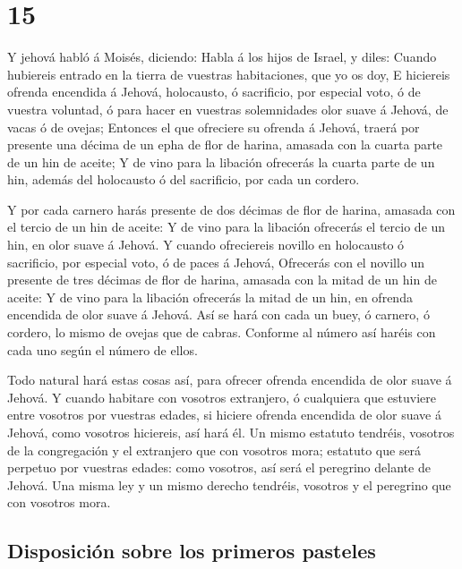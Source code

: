 \hypertarget{section-14}{%
\section{15}\label{section-14}}

 Y jehová habló á Moisés, diciendo:  Habla á los
hijos de Israel, y diles: Cuando hubiereis entrado en la tierra de
vuestras habitaciones, que yo os doy,  E hiciereis ofrenda
encendida á Jehová, holocausto, ó sacrificio, por especial voto, ó de
vuestra voluntad, ó para hacer en vuestras solemnidades olor suave á
Jehová, de vacas ó de ovejas;  Entonces el que ofreciere su
ofrenda á Jehová, traerá por presente una décima de un epha de flor de
harina, amasada con la cuarta parte de un hin de aceite;  Y
de vino para la libación ofrecerás la cuarta parte de un hin, además del
holocausto ó del sacrificio, por cada un cordero.

 Y por cada carnero harás presente de dos décimas de flor de
harina, amasada con el tercio de un hin de aceite:  Y de
vino para la libación ofrecerás el tercio de un hin, en olor suave á
Jehová.  Y cuando ofreciereis novillo en holocausto ó
sacrificio, por especial voto, ó de paces á Jehová, 
Ofrecerás con el novillo un presente de tres décimas de flor de harina,
amasada con la mitad de un hin de aceite:  Y de vino para
la libación ofrecerás la mitad de un hin, en ofrenda encendida de olor
suave á Jehová.  Así se hará con cada un buey, ó carnero, ó
cordero, lo mismo de ovejas que de cabras.  Conforme al
número así haréis con cada uno según el número de ellos.

 Todo natural hará estas cosas así, para ofrecer ofrenda
encendida de olor suave á Jehová.  Y cuando habitare con
vosotros extranjero, ó cualquiera que estuviere entre vosotros por
vuestras edades, si hiciere ofrenda encendida de olor suave á Jehová,
como vosotros hiciereis, así hará él.  Un mismo estatuto
tendréis, vosotros de la congregación y el extranjero que con vosotros
mora; estatuto que será perpetuo por vuestras edades: como vosotros, así
será el peregrino delante de Jehová.  Una misma ley y un
mismo derecho tendréis, vosotros y el peregrino que con vosotros mora.

\hypertarget{disposiciuxf3n-sobre-los-primeros-pasteles}{%
\subsection{Disposición sobre los primeros
pasteles}\label{disposiciuxf3n-sobre-los-primeros-pasteles}}

